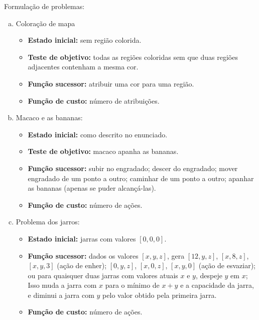 \begin{solution}
Formulação de problemas:
\begin{enumerate}[a.]
	\item Coloração de mapa
	\begin{itemize}
		\item \textbf{Estado inicial:} sem região colorida.
		\item \textbf{Teste de objetivo:} todas as regiões coloridas sem que duas regiões adjacentes contenham a mesma cor.
		\item \textbf{Função sucessor:} atribuir uma cor para uma região.
		\item \textbf{Função de custo:} número de atribuições.
	\end{itemize}
	
	\item Macaco e as bananas:
	\begin{itemize}
		\item \textbf{Estado inicial:} como descrito no enunciado.
		\item \textbf{Teste de objetivo:} macaco apanha as bananas.
		\item \textbf{Função sucessor:} subir no engradado; descer do engradado; mover engradado de um ponto a outro; caminhar de um ponto a outro; apanhar as bananas (apenas se puder alcançá-las).
		\item \textbf{Função de custo:} número de ações.
	\end{itemize}	
	
	\item Problema dos jarros:
	\begin{itemize}
		\item \textbf{Estado inicial:} jarras com valores $[0, 0, 0]$.
		\item \textbf{Função sucessor:} dados os valores $[x, y, z]$, gera $[12, y, z]$, $[x, 8, z]$, $[x, y, 3]$ (ação de enher); $[0, y, z]$, $[x, 0, z]$, $[x, y, 0]$ (ação de esvaziar); ou para quaisquer duas jarras com valores atuais $x$ e $y$, despeje $y$ em $x$; Isso muda a jarra com $x$ para o mínimo de $x + y$ e a capacidade da jarra, e diminui a jarra com $y$ pelo valor obtido pela primeira jarra.
		\item \textbf{Função de custo:} número de ações.
	\end{itemize}
	
\end{enumerate}
\end{solution}


